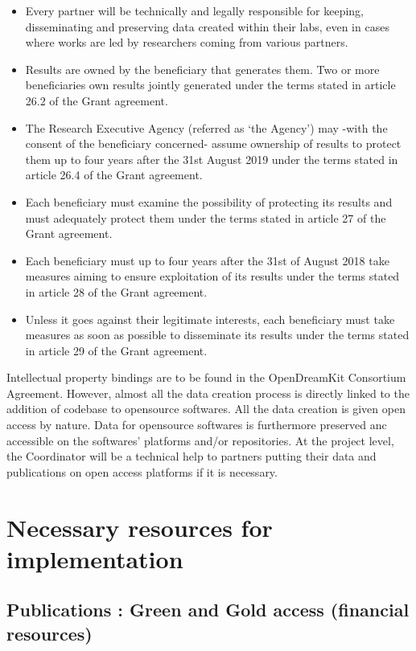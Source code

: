 \documentclass{deliverablereport}
\begin{document}
\begin{itemize}
\item{}Every partner will be technically and legally responsible for keeping, disseminating and preserving data created within their labs, even in cases where works are led by researchers coming from various partners.
\item{}Results are owned by the beneficiary that generates them. Two or more beneficiaries own results jointly generated under the terms stated in article 26.2 of the Grant agreement.
\item{}The Research Executive Agency (referred as ‘the Agency’) may -with the consent of the beneficiary concerned- assume ownership of results to protect them up to four years after the 31st August 2019 under the terms stated in article 26.4 of the Grant agreement.
\item{}Each beneficiary must examine the possibility of protecting its results and must adequately protect them under the terms stated in article 27 of the Grant agreement.
\item{}Each beneficiary must up to four years after the 31st of August 2018 take measures aiming to ensure exploitation of its results under the terms stated in article 28 of the Grant agreement.
\item{}Unless it goes against their legitimate interests, each beneficiary must take measures as soon as possible to disseminate its results under the terms stated in article 29 of the Grant agreement.
\end{itemize}
 

Intellectual property bindings are to be found in the OpenDreamKit Consortium Agreement.
However, almost all the data creation process is directly linked to the addition of  codebase to opensource softwares. All the data creation is given open access by nature. Data for opensource softwares is furthermore preserved anc accessible on the softwares' platforms and/or repositories.
At the project level, the Coordinator will be a technical help to partners putting their data and publications on open access platforms if it is necessary.

\section{Necessary resources for implementation}
\subsection{Publications : Green and Gold access (financial resources)}
\end{document}
